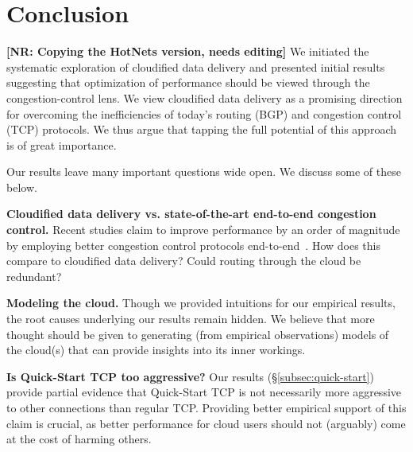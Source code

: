 \documentclass[sigconf,usenames,dvipsnames,geometry]{acmart}
\newcommand{\mycomm}[3]{{\color{#2} \textbf{[#1: #3]}}}
\newcommand{\mycomm}[3]{}
\newcommand{\NR}[1]{\mycomm{NR}{OliveGreen}{#1}}
\newcommand{\T}[1]{\smallskip\noindent\textbf{#1}} %
\begin{document}
\section{Conclusion}
\NR{Copying the HotNets version, needs editing}
We initiated the systematic exploration of cloudified data delivery and presented initial results suggesting that optimization of performance should be viewed through the congestion-control lens.  We view cloudified data delivery as a promising direction for overcoming the inefficiencies of today's routing (BGP) and congestion control (TCP) protocols. We thus argue that tapping the full potential of this approach is of great importance. 

Our results leave many important questions wide open. We discuss some of these below.

\T{Cloudified data delivery vs. state-of-the-art end-to-end congestion control.} Recent studies claim to improve performance by an order of magnitude by employing better congestion control protocols end-to-end~\cite{PCC}. How does this compare to cloudified data delivery? Could routing through the cloud be redundant?

\T{Modeling the cloud.} Though we provided intuitions for our empirical results, the root causes underlying our results remain hidden. We believe that more thought should be given to generating (from empirical observations) models of the cloud(s) that can provide insights into its inner workings.

\T{Is Quick-Start TCP too aggressive?} Our results (\S\ref{subsec:quick-start}) provide partial evidence that Quick-Start TCP is not necessarily more aggressive to other connections than regular TCP. Providing better empirical support of this claim is crucial, as better performance for cloud users should not (arguably) come at the cost of harming others.
\end{document}
